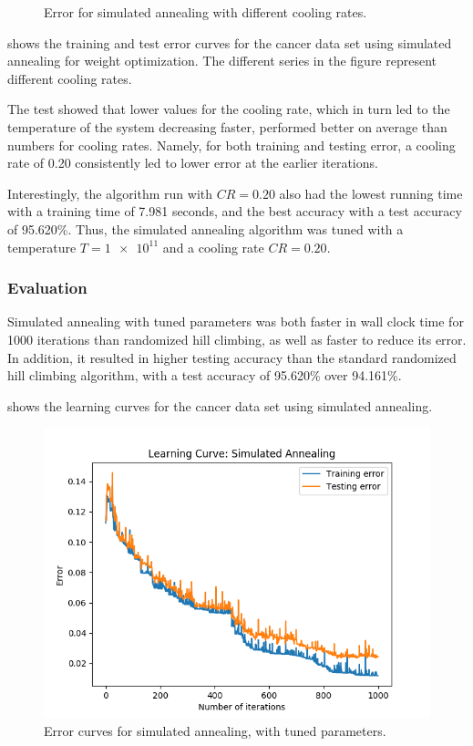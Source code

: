 \documentclass{article}
\begin{document}
\begin{figure}[htb]
        \caption{Error for simulated annealing with different cooling rates.}
        \label{fig:sa-params}
        \end{figure}

         shows the training and test error curves for the cancer data set using simulated annealing for weight optimization. The different series in the figure represent different cooling rates.

        The test showed that lower values for the cooling rate, which in turn led to the temperature of the system decreasing faster, performed better on average than numbers for cooling rates. Namely, for both training and testing error, a cooling rate of 0.20 consistently led to lower error at the earlier iterations.

        Interestingly, the algorithm run with $CR = \num{0.20}$ also had the lowest running time with a training time of 7.981 seconds, and the best accuracy with a test accuracy of 95.620\%. Thus, the simulated annealing algorithm was tuned with a temperature $T = \num{1e11}$ and a cooling rate $CR = \num{0.20}$.

      \subsubsection{Evaluation}
        Simulated annealing with tuned parameters was both faster in wall clock time for 1000 iterations than randomized hill climbing, as well as faster to reduce its error. In addition, it resulted in higher testing accuracy than the standard randomized hill climbing algorithm, with a test accuracy of 95.620\% over 94.161\%.

         shows the learning curves for the cancer data set using simulated annealing.

        \begin{figure}[htb]
        \centering
        \includegraphics[width=.5\linewidth]{out/plot/SA.png}
        \caption{Error curves for simulated annealing, with tuned parameters.}
        \label{fig:sa-learning}
        \end{figure}
\end{document}

